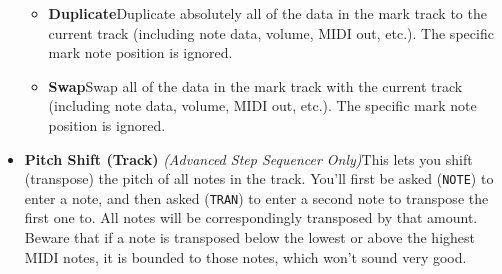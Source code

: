 \documentclass{article}
\begin{document}
\begin{itemize}
\begin{itemize}
\item {\bf Duplicate}\quad Duplicate absolutely all of the data in the mark track to the current track (including note data, volume, MIDI out, etc.).  The specific mark note position is ignored.
\item {\bf Swap}\quad Swap all of the data in the mark track with the current track (including note data, volume, MIDI out, etc.).  The specific mark note position is ignored.
\end{itemize}
\item {\bf Pitch Shift (Track)} {\it (Advanced Step Sequencer Only)}\quad This lets you shift (transpose) the pitch of all notes in the track.  You'll first be asked ({\tt NOTE}) to enter a note, and then asked ({\tt TRAN}) to enter a second note to transpose the first one to.  All notes will be correspondingly transposed by that amount.  Beware that if a note is transposed below the lowest or above the highest MIDI notes, it is bounded to those notes, which won't sound very good.


\end{itemize}
\end{document}
